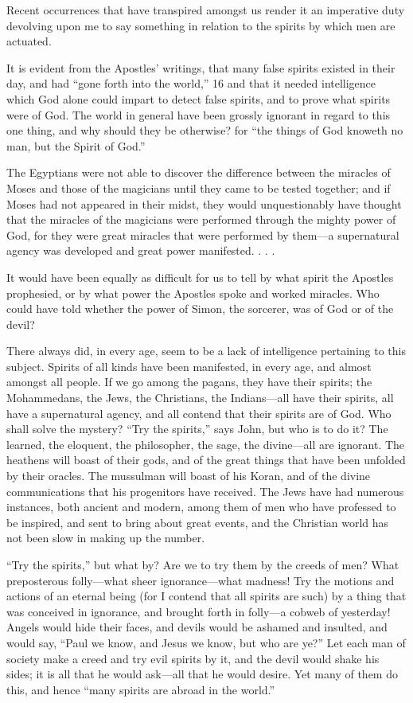Recent occurrences that have transpired amongst us render it an imperative duty devolving
upon me to say something in relation to the spirits by which men are actuated.

It is evident from the Apostles' writings, that many false spirits existed in their day, and had
``gone forth into the world,'' 16 and that it needed intelligence which God alone could impart
to detect false spirits, and to prove what spirits were of God. The world in general have been
grossly ignorant in regard to this one thing, and why should they be otherwise? for ``the
things of God knoweth no man, but the Spirit of God.''

The Egyptians were not able to discover the difference between the miracles of Moses and
those of the magicians until they came to be tested together; and if Moses had not appeared
in their midst, they would unquestionably have thought that the miracles of the magicians
were performed through the mighty power of God, for they were great miracles that were
performed by them—a supernatural agency was developed and great power manifested. . . .

It would have been equally as difficult for us to tell by what spirit the Apostles prophesied, or
by what power the Apostles spoke and worked miracles. Who could have told whether the
power of Simon, the sorcerer, was of God or of the devil?

There always did, in every age, seem to be a lack of intelligence pertaining to this subject.
Spirits of all kinds have been manifested, in every age, and almost amongst all people. If we
go among the pagans, they have their spirits; the Mohammedans, the Jews, the Christians, the
Indians—all have their spirits, all have a supernatural agency, and all contend that their
spirits are of God. Who shall solve the mystery? ``Try the spirits,'' says John, but who is to do
it? The learned, the eloquent, the philosopher, the sage, the divine—all are ignorant. The
heathens will boast of their gods, and of the great things that have been unfolded by their
oracles. The mussulman will boast of his Koran, and of the divine communications that his
progenitors have received. The Jews have had numerous instances, both ancient and modern,
among them of men who have professed to be inspired, and sent to bring about great events,
and the Christian world has not been slow in making up the number.

``Try the spirits,'' but what by? Are we to try them by the creeds of men? What preposterous
folly—what sheer ignorance—what madness! Try the motions and actions of an eternal being
(for I contend that all spirits are such) by a thing that was conceived in ignorance, and
brought forth in folly—a cobweb of yesterday! Angels would hide their faces, and devils
would be ashamed and insulted, and would say, ``Paul we know, and Jesus we know, but who
are ye?'' Let each man of society make a creed and try evil spirits by it, and the devil would
shake his sides; it is all that he would ask—all that he would desire. Yet many of them do
this, and hence ``many spirits are abroad in the world.''

